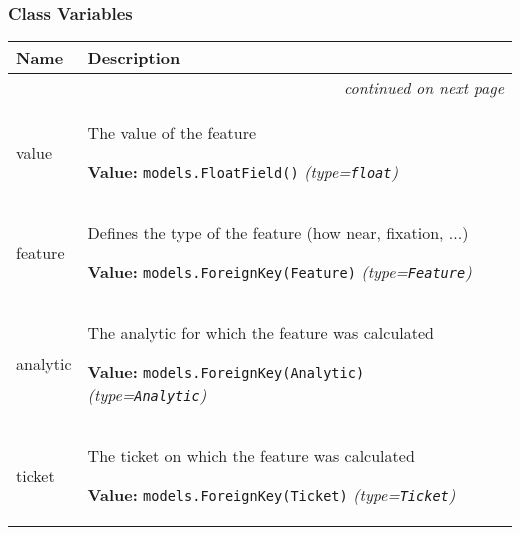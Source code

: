 
  \subsubsection{Class Variables}

    \vspace{-1cm}
\hspace{\varindent}\begin{longtable}{|p{\varnamewidth}|p{\vardescrwidth}|l}
\cline{1-2}
\cline{1-2} \centering \textbf{Name} & \centering \textbf{Description}& \\
\cline{1-2}
\endhead\cline{1-2}\multicolumn{3}{r}{\small\textit{continued on next page}}\\\endfoot\cline{1-2}
\endlastfoot\raggedright v\-a\-l\-u\-e\- & \raggedright The value of the feature

\textbf{Value:} 
{\tt models.FloatField()}            {\it (type=\texttt{float})}&\\
\cline{1-2}
\raggedright f\-e\-a\-t\-u\-r\-e\- & \raggedright Defines the type of the feature (how near, fixation, ...)

\textbf{Value:} 
{\tt models.ForeignKey(Feature)}            {\it (type=\texttt{Feature})}&\\
\cline{1-2}
\raggedright a\-n\-a\-l\-y\-t\-i\-c\- & \raggedright The analytic for which the feature was calculated

\textbf{Value:} 
{\tt models.ForeignKey(Analytic)}            {\it (type=\texttt{Analytic})}&\\
\cline{1-2}
\raggedright t\-i\-c\-k\-e\-t\- & \raggedright The ticket on which the feature was calculated

\textbf{Value:} 
{\tt models.ForeignKey(Ticket)}            {\it (type=\texttt{Ticket})}&\\
\cline{1-2}
\end{longtable}



